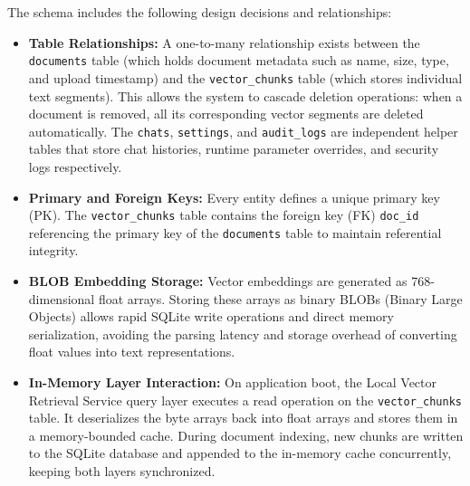 \documentclass[12pt,a4paper]{report}
\begin{document}
The schema includes the following design decisions and relationships:
\begin{itemize}
    \item \textbf{Table Relationships:} A one-to-many relationship exists between the \texttt{documents} table (which holds document metadata such as name, size, type, and upload timestamp) and the \texttt{vector\_chunks} table (which stores individual text segments). This allows the system to cascade deletion operations: when a document is removed, all its corresponding vector segments are deleted automatically. The \texttt{chats}, \texttt{settings}, and \texttt{audit\_logs} are independent helper tables that store chat histories, runtime parameter overrides, and security logs respectively.
    \item \textbf{Primary and Foreign Keys:} Every entity defines a unique primary key (PK). The \texttt{vector\_chunks} table contains the foreign key (FK) \texttt{doc\_id} referencing the primary key of the \texttt{documents} table to maintain referential integrity.
    \item \textbf{BLOB Embedding Storage:} Vector embeddings are generated as 768-dimensional float arrays. Storing these arrays as binary BLOBs (Binary Large Objects) allows rapid SQLite write operations and direct memory serialization, avoiding the parsing latency and storage overhead of converting float values into text representations.
    \item \textbf{In-Memory Layer Interaction:} On application boot, the Local Vector Retrieval Service query layer executes a read operation on the \texttt{vector\_chunks} table. It deserializes the byte arrays back into float arrays and stores them in a memory-bounded cache. During document indexing, new chunks are written to the SQLite database and appended to the in-memory cache concurrently, keeping both layers synchronized.
\end{itemize}
\end{document}
